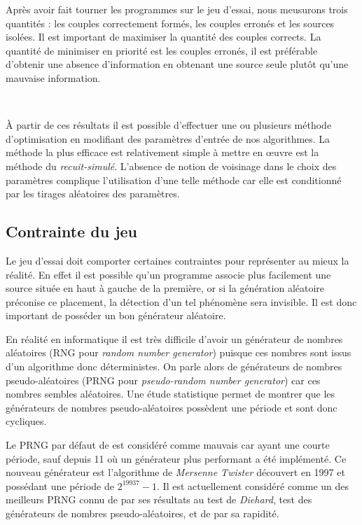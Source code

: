 Après avoir fait tourner les programmes sur le jeu d'essai, nous meusurons trois quantités : les couples correctement formés, les couples erronés et les sources isolées. Il est important de maximiser la quantité des couples corrects. La quantité de minimiser en priorité est les couples erronés, il est préférable d'obtenir une absence d'information en obtenant une source seule plutôt qu'une mauvaise information.

\ 

À partir de ces résultats il est possible d'effectuer une ou plusieurs méthode d'optimisation en modifiant des paramètres d'entrée de nos algorithmes. La méthode la plus efficace est relativement simple à mettre en \oe{}uvre est la méthode du \emph{recuit-simulé}. L'absence de notion de voisinage dans le choix des paramètres complique l'utilisation d'une telle méthode car elle est conditionné par les tirages aléatoires des paramètres.

	\subsection{Contrainte du jeu}

Le jeu d'essai doit comporter certaines contraintes pour représenter au mieux la réalité. En effet il est possible qu'un programme associe plus facilement une source située en haut à gauche de la première, or si la génération aléatoire préconise ce placement, la détection d'un tel phénomène sera invisible. Il est donc important de posséder un bon générateur aléatoire.

En réalité en informatique il est très difficile d'avoir un générateur de nombres aléatoires (RNG pour \emph{random number generator}) puisque ces nombres sont issus d'un algorithme donc déterministes. On parle alors de générateurs de nombres pseudo-aléatoires (PRNG pour \emph{pseudo-random number generator}) car ces nombres sembles aléatoires. Une étude statistique permet de montrer que les générateurs de nombres pseudo-aléatoires possèdent une période et sont donc cycliques.

Le PRNG par défaut de \Cpp{} est considéré comme mauvais car ayant une courte période, sauf depuis \Cpp{}11 où un générateur plus performant a été implémenté. Ce nouveau générateur est l'algorithme de \emph{Mersenne Twister} découvert en 1997 et possédant une période de $2^{19937}-1$. Il est actuellement considéré comme un des meilleurs PRNG connu de par ses résultats au test de \emph{Diehard}, test des générateurs de nombres pseudo-aléatoires, et de par sa rapidité.

